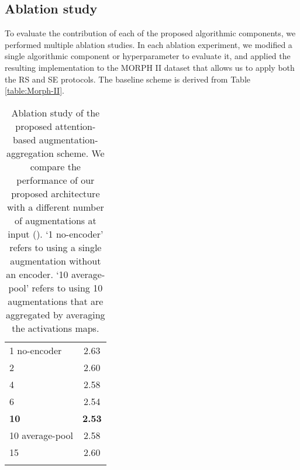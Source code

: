 \documentclass[10pt,journal]{IEEEtran}\usepackage{amsfonts}
\begin{document}
\subsection{Ablation study}

\label{subsec:Ablation study}

To evaluate the contribution of each of the proposed algorithmic components,
we performed multiple ablation studies. In each ablation experiment, we
modified a single algorithmic component or hyperparameter to evaluate it, and
applied the resulting implementation to the MORPH II dataset that allows us to
apply both the RS and SE protocols. The baseline scheme is derived from Table
\ref{table:Morph-II}.

\begin{table}[tbh]
\caption{Ablation study of the proposed attention-based
augmentation-aggregation scheme. We compare the performance of our proposed
architecture with a different number of augmentations at input (). `1
no-encoder' refers to using a single augmentation without an encoder. `10
average-pool' refers to using 10 augmentations that are aggregated by
averaging the activations maps.}\label{table:ablation-aug}
\centering
\renewcommand{\arraystretch}{1.3}
\begin{tabular}
[c]{@{}lc}\toprule  & \\
\midrule 1 no-encoder & 2.63\\
2 & 2.60\\
4 & 2.58\\
6 & 2.54\\
\textbf{10} & \textbf{2.53}\\
10 average-pool & 2.58\\
15 & 2.60\\
\bottomrule &
\end{tabular}
\end{table}
\end{document}

